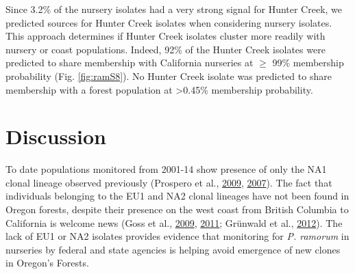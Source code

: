 \documentclass[double,11pt]{beavtex}
\begin{document}
  Since 3.2\% of the nursery isolates had a very strong signal for Hunter
  Creek, we predicted sources for Hunter Creek isolates when considering
  nursery isolates. This approach determines if Hunter Creek isolates
  cluster more readily with nursery or coast populations. Indeed, 92\% of
  the Hunter Creek isolates were predicted to share membership with
  California nurseries at \(\geq\) 99\% membership probability (Fig.
  \ref{fig:ramS8}). No Hunter Creek isolate was predicted to share
  membership with a forest population at \textgreater{}0.45\% membership
  probability.
  
  \section{Discussion}\label{discussion-1}
  
  To date populations monitored from 2001-14 show presence of only the NA1
  clonal lineage observed previously (Prospero et al.,
  \protect\hyperlink{ref-prospero2009migration}{2009},
  \protect\hyperlink{ref-prospero2007population}{2007}). The fact that
  individuals belonging to the EU1 and NA2 clonal lineages have not been
  found in Oregon forests, despite their presence on the west coast from
  British Columbia to California is welcome news (Goss et al.,
  \protect\hyperlink{ref-goss2009population}{2009},
  \protect\hyperlink{ref-goss2011phytophthora}{2011}; Grünwald et al.,
  \protect\hyperlink{ref-grunwald2012emergence}{2012}). The lack of EU1 or
  NA2 isolates provides evidence that monitoring for \emph{P. ramorum} in
  nurseries by federal and state agencies is helping avoid emergence of
  new clones in Oregon's Forests.
  
\end{document}
